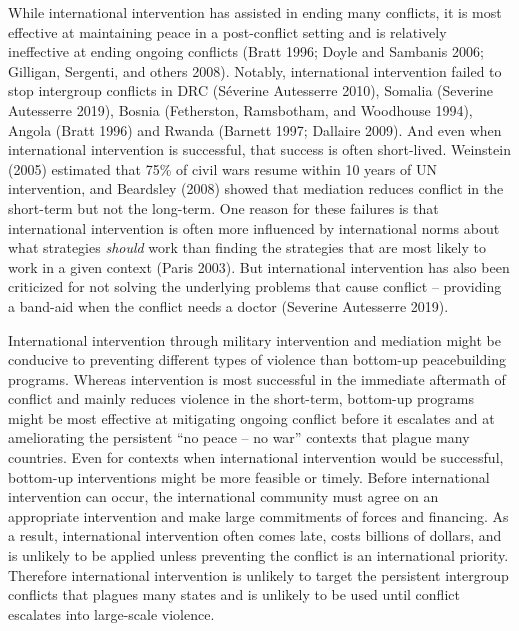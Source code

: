 \documentclass[11pt]{article}
\begin{document}
While international intervention has assisted in ending many conflicts,
it is most effective at maintaining peace in a post-conflict setting and
is relatively ineffective at ending ongoing conflicts (Bratt 1996; Doyle
and Sambanis 2006; Gilligan, Sergenti, and others 2008). Notably,
international intervention failed to stop intergroup conflicts in DRC
(Séverine Autesserre 2010), Somalia (Severine Autesserre 2019), Bosnia
(Fetherston, Ramsbotham, and Woodhouse 1994), Angola (Bratt 1996) and
Rwanda (Barnett 1997; Dallaire 2009). And even when international
intervention is successful, that success is often short-lived. Weinstein
(2005) estimated that 75\% of civil wars resume within 10 years of UN
intervention, and Beardsley (2008) showed that mediation reduces
conflict in the short-term but not the long-term. One reason for these
failures is that international intervention is often more influenced by
international norms about what strategies \emph{should} work than
finding the strategies that are most likely to work in a given context
(Paris 2003). But international intervention has also been criticized
for not solving the underlying problems that cause conflict -- providing
a band-aid when the conflict needs a doctor (Severine Autesserre 2019).

International intervention through military intervention and mediation
might be conducive to preventing different types of violence than
bottom-up peacebuilding programs. Whereas intervention is most
successful in the immediate aftermath of conflict and mainly reduces
violence in the short-term, bottom-up programs might be most effective
at mitigating ongoing conflict before it escalates and at ameliorating
the persistent ``no peace -- no war'' contexts that plague many
countries. Even for contexts when international intervention would be
successful, bottom-up interventions might be more feasible or timely.
Before international intervention can occur, the international community
must agree on an appropriate intervention and make large commitments of
forces and financing. As a result, international intervention often
comes late, costs billions of dollars, and is unlikely to be applied
unless preventing the conflict is an international priority. Therefore
international intervention is unlikely to target the persistent
intergroup conflicts that plagues many states and is unlikely to be used
until conflict escalates into large-scale violence.
\end{document}
